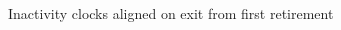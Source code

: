 \documentclass[20pt,usenames,dvipsnames]{beamer}
\begin{document}
\begin{frame}[plain]
\Large
\begin{center}
Inactivity clocks aligned on exit from first retirement
\vspace{2em}
\begin{overlayarea}{\textwidth}{.8\textheight}
\centering
{}

\end{overlayarea}
\end{center}
\end{frame}
\end{document}
